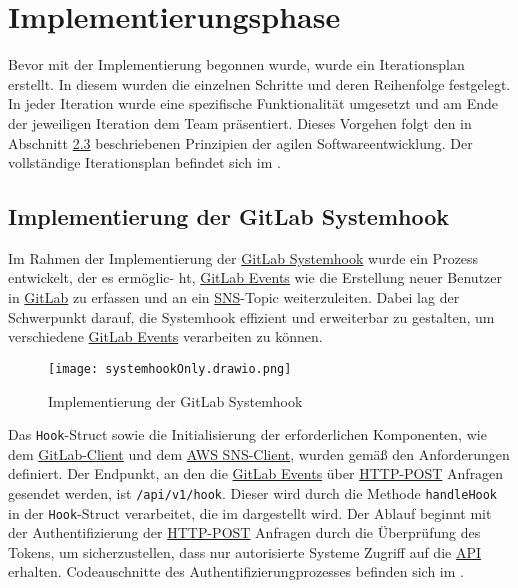 \section{Implementierungsphase} 
\label{sec:Implementierungsphase}

Bevor mit der Implementierung begonnen wurde, wurde ein Iterationsplan erstellt. In diesem wurden die einzelnen Schritte und deren Reihenfolge festgelegt. In jeder Iteration wurde eine spezifische Funktionalität umgesetzt und am Ende der jeweiligen Iteration dem Team präsentiert. Dieses Vorgehen folgt den in Abschnitt \hyperlink{agil}{2.3} beschriebenen Prinzipien der agilen Softwareentwicklung. Der vollständige Iterationsplan befindet sich im .

\subsection{Implementierung der GitLab Systemhook}
\label{sec:ImplementierungGitlabSystemhook}

Im Rahmen der Implementierung der \hyperlink{GitLab}{\textcolor{AOBlau}{GitLab Systemhook}} wurde ein Prozess entwickelt, der es ermöglic-
ht, \hyperlink{GitLabEvent}{\textcolor{AOBlau}{GitLab Events}} wie die Erstellung neuer Benutzer in \hyperlink{GitLab}{\textcolor{AOBlau}{GitLab}} zu erfassen und an ein \hyperlink{SNS}{\textcolor{AOBlau}{SNS}}-Topic weiterzuleiten. Dabei lag der Schwerpunkt darauf, die Systemhook effizient und erweiterbar zu gestalten, um verschiedene \hyperlink{GitLabEvent}{\textcolor{AOBlau}{GitLab Events}} verarbeiten zu können.

\begin{figure}[htb]
    \centering
    \texttt{[image: systemhookOnly.drawio.png]}
    \caption{Implementierung der GitLab Systemhook}
\end{figure}

Das \texttt{Hook}-Struct sowie die Initialisierung der erforderlichen Komponenten, wie dem \hyperlink{GitLabClient}{\textcolor{AOBlau}{GitLab-Client}} und dem \hyperlink{SNSClient}{\textcolor{AOBlau}{AWS SNS-Client}}, wurden gemäß den Anforderungen definiert.  Der Endpunkt, an den die \hyperlink{GitLabEvent}{\textcolor{AOBlau}{GitLab Events}} über \hyperlink{HTTPPOST}{\textcolor{AOBlau}{HTTP-POST}} Anfragen gesendet werden, ist \texttt{/api/v1/hook}. Dieser wird durch die Methode \texttt{handleHook} in der \texttt{Hook}-Struct verarbeitet, die im  dargestellt wird. Der Ablauf beginnt mit der Authentifizierung der \hyperlink{HTTP}{\textcolor{AOBlau}{HTTP-POST}} Anfragen durch die Überprüfung des Tokens, um sicherzustellen, dass nur autorisierte Systeme Zugriff auf die \hyperlink{API}{\textcolor{AOBlau}{API}} erhalten. Codeauschnitte des Authentifizierungprozesses befinden sich im .

